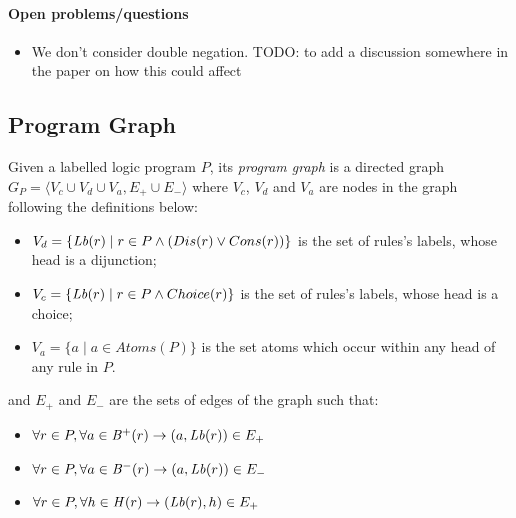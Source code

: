\paragraph{Open problems/questions}
\begin{itemize}
  \item
  {\color{red} We don't consider double negation.}
  TODO: to add a discussion somewhere in the paper on how this could affect
\end{itemize}

\subsection{Program Graph}

%
\begin{definition}
%
Given a labelled logic program $P$, its \emph{program graph} is a directed graph
$G_P = \langle V_c \cup V_d \cup V_a, E_{+} \cup E_{-} \rangle$
where
%
$V_c$, $V_d$ and $V_a$ are nodes in the graph following the definitions below:
\begin{itemize}
    \item $V_d = \{ \mathit{Lb}(r) \mid r \in P \land (Dis(r) \vee Cons(r))      \}$ is the set of rules's labels, whose head is a dijunction;
    \item $V_c = \{ \mathit{Lb}(r) \mid r \in P \land Choice(r)    \}$ is the set of rules's labels, whose head is a choice;
    \item $V_a = \{ a      \mid a \in Atoms(P) \}$ is the set atoms which occur within any head of any rule in $P$.
\end{itemize}

and $E_{+}$ and $E_{-}$ are the sets of edges of the graph such that:
\begin{itemize}
  \item $\forall r \in P, \forall a \in \mathit{B}^+(r)  \rightarrow (a,\mathit{Lb}(r))  \in E_{+}$
  \item $\forall r \in P, \forall a \in \mathit{B}^-(r) \rightarrow (a, \mathit{Lb}(r)) \in E_{-}$
  \item $\forall r \in P, \forall h \in \mathit{H}(r)  \rightarrow (\mathit{Lb}(r), h) \in E_{+}$
\end{itemize}
%
\end{definition}
%

